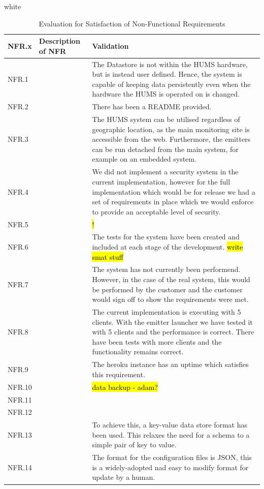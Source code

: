 \documentclass[10pt,a4paper]{article}
\newcommand{\xtableformat}[4]{
\begin{table}[ht!]
\centering
  \rowcolors{2}{gray!10} {white}
\begin{tabularx}{\textwidth}{#1}
  \hline
  \rowcolor[gray]{0.9} #2
  \hline
\end{tabularx}
\caption{#3}
\label{#4}
\end{table}}
\begin{document}
\xtableformat{ p{1.6cm}  p{4.4cm}  p{8.6cm} }{
	NFR.x  & 	Description of NFR  & 	Validation \\ \hline
	NFR.1  & 	  & 	The Datastore is not within the HUMS hardware, but is instead user defined. Hence, the system is capable of keeping data persistently even when the hardware the HUMS is operated on is changed. \\ 
	NFR.2  & 	  & 	There has been a README provided. \\ 
	NFR.3  & 	  & 	The HUMS system can be utilised regardless of geographic location, as the main monitoring site is accessible from the web. Furthermore, the emitters can be run detached from the main system, for example on an embedded system. \\ 
	NFR.4  & 	  & 	We did not implement a security system in the current implementation, however for the full implementation which would be for release we had a set of requirements in place which we would enforce to provide an acceptable level of security. \\ 
	NFR.5  & 	  & 	\hl{!} \\
	NFR.6  & 	  & 	The tests for the system have been created and included at each stage of the development. \hl{write smat stuff} \\
	NFR.7  & 	  & 	The system has not currently been performend. However, in the case of the real system, this would be performed by the customer and the customer would sign off to show the requirements were met. \\
	NFR.8  & 	  & 	The current implementation is executing with 5 clients. With the emitter launcher we have tested it with 5 clients and the performance is correct. There have been tests with more clients and the functionality remains correct. \\ 
	NFR.9  & 	  & 	The heroku instance has an uptime which satisfies this requirement. \\ 
	NFR.10  & 	  & 	\hl{data backup - adam?} \\ 
	NFR.11  & 	  & 	 \\ 
	NFR.12  & 	  & 	 \\ 
	NFR.13  & 	  & 	To achieve this, a key-value data store format has been used. This relaxes the need for a schema to a simple pair of key to value. \\
	NFR.14  & 	  & 	The format for the configuration files is JSON, this is a widely-adopted nad easy to modify format for update by a human. \\
}{Evaluation for Satisfaction of Non-Functional Requirements}{nfrevaltable}
\end{document}
